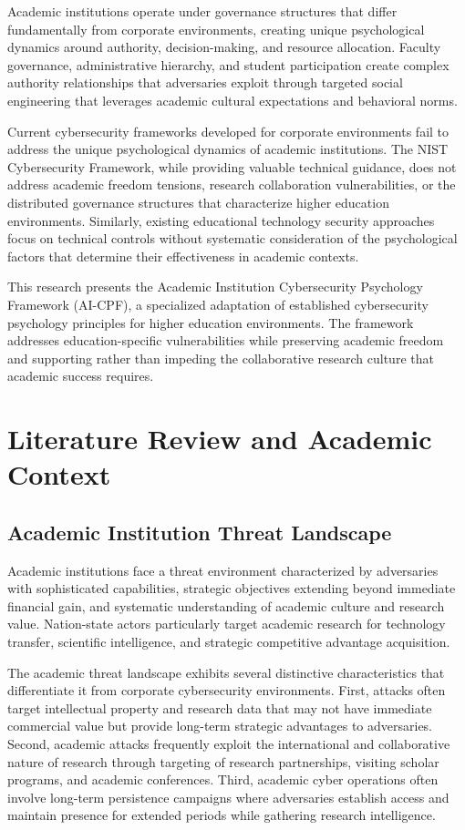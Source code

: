 \documentclass[10pt, twocolumn]{article}
\begin{document}
Academic institutions operate under governance structures that differ fundamentally from corporate environments, creating unique psychological dynamics around authority, decision-making, and resource allocation. Faculty governance, administrative hierarchy, and student participation create complex authority relationships that adversaries exploit through targeted social engineering that leverages academic cultural expectations and behavioral norms.

Current cybersecurity frameworks developed for corporate environments fail to address the unique psychological dynamics of academic institutions. The NIST Cybersecurity Framework, while providing valuable technical guidance, does not address academic freedom tensions, research collaboration vulnerabilities, or the distributed governance structures that characterize higher education environments. Similarly, existing educational technology security approaches focus on technical controls without systematic consideration of the psychological factors that determine their effectiveness in academic contexts.

This research presents the Academic Institution Cybersecurity Psychology Framework (AI-CPF), a specialized adaptation of established cybersecurity psychology principles for higher education environments. The framework addresses education-specific vulnerabilities while preserving academic freedom and supporting rather than impeding the collaborative research culture that academic success requires.

\section{Literature Review and Academic Context}

\subsection{Academic Institution Threat Landscape}

Academic institutions face a threat environment characterized by adversaries with sophisticated capabilities, strategic objectives extending beyond immediate financial gain, and systematic understanding of academic culture and research value. Nation-state actors particularly target academic research for technology transfer, scientific intelligence, and strategic competitive advantage acquisition.

The academic threat landscape exhibits several distinctive characteristics that differentiate it from corporate cybersecurity environments. First, attacks often target intellectual property and research data that may not have immediate commercial value but provide long-term strategic advantages to adversaries. Second, academic attacks frequently exploit the international and collaborative nature of research through targeting of research partnerships, visiting scholar programs, and academic conferences. Third, academic cyber operations often involve long-term persistence campaigns where adversaries establish access and maintain presence for extended periods while gathering research intelligence.
\end{document}
